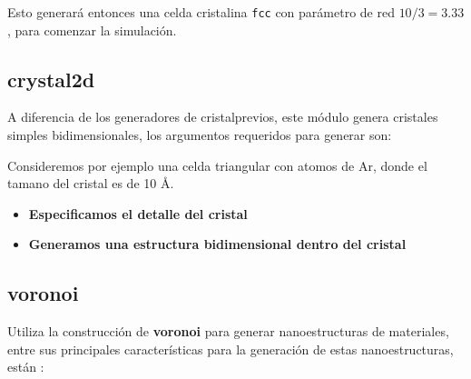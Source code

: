 Esto generar\'a entonces una celda cristalina \verb|fcc| con par\'ametro de red $10/3 = 3.33$, para comenzar la simulaci\'on.

\subsection{crystal2d}
A diferencia de los generadores de cristalprevios, este m\'odulo genera cristales simples bidimensionales, los argumentos requeridos para generar son:


Consideremos por ejemplo una celda triangular con atomos de Ar, donde el tamano del cristal es de 10 \AA.

\begin{itemize}
 \item \textbf{Especificamos el detalle del cristal}
 \item \textbf{Generamos una estructura bidimensional dentro del cristal}
\end{itemize}

\subsection{voronoi}
Utiliza la construcci\'on de \textbf{voronoi} para generar nanoestructuras de materiales, entre sus principales caracter\'isticas para la generaci\'on de estas nanoestructuras, est\'an :


